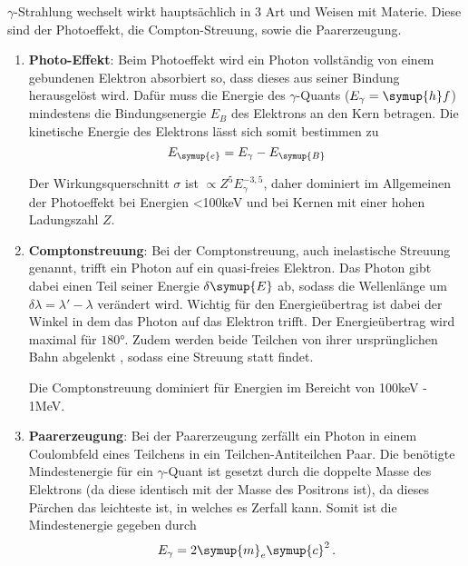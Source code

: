\noindent
$\gamma$-Strahlung wechselt wirkt hauptsächlich in 3 Art und Weisen mit Materie. 
Diese sind der Photoeffekt, die Compton-Streuung, sowie die Paarerzeugung.
\begin{enumerate}
  \item \textbf{Photo-Effekt}:
  Beim Photoeffekt wird ein Photon vollständig von einem gebundenen Elektron absorbiert so, dass dieses aus seiner Bindung herausgelöst wird. 
  Dafür muss die Energie des $\gamma$-Quants ($E_\gamma = \symup{h}f$) mindestens die Bindungsenergie $E_B$ des Elektrons an den Kern betragen. Die
  kinetische Energie des Elektrons lässt sich somit bestimmen zu 
  \begin{equation}
    E_{\symup{e}} = E_\gamma - E_{\symup{B}}
    \label{eqn:1}
  \end{equation}

  \noindent
  Der Wirkungsquerschnitt $\sigma$ ist $\propto Z^5E_\gamma^{-3,5}$, daher dominiert im Allgemeinen 
  der Photoeffekt bei Energien <100keV und bei Kernen mit einer hohen Ladungszahl $Z$.

  \item \textbf{Comptonstreuung}:
  Bei der Comptonstreuung,  auch inelastische Streuung genannt, trifft ein Photon auf ein quasi-freies Elektron. 
  Das Photon gibt dabei einen Teil seiner Energie $\delta \symup{E}$
  ab, sodass die Wellenlänge um $\delta\lambda = \lambda' - \lambda $ verändert wird.
  Wichtig für den Energieübertrag ist dabei der Winkel in dem das Photon auf das Elektron trifft. Der 
  Energieübertrag wird maximal für $180°$. Zudem werden beide Teilchen von ihrer ursprünglichen Bahn abgelenkt
, sodass eine Streuung statt findet.

\noindent
Die Comptonstreuung dominiert für Energien im Bereicht von 100keV - 1MeV.


  \item \textbf{Paarerzeugung}:
  Bei der Paarerzeugung zerfällt ein Photon in einem Coulombfeld eines Teilchens in ein Teilchen-Antiteilchen Paar.
  Die benötigte Mindestenergie für ein $\gamma$-Quant ist gesetzt durch die doppelte Masse des Elektrons (da diese
  identisch mit der Masse des Positrons ist), da dieses Pärchen das leichteste ist, in welches es Zerfall kann.
  Somit ist die Mindestenergie gegeben durch 
  \begin{equation}
    E_\gamma =  2 \symup{m}_e \symup{c}^2 \, .
    \label{eqn:3}
  \end{equation}
\end{enumerate}

